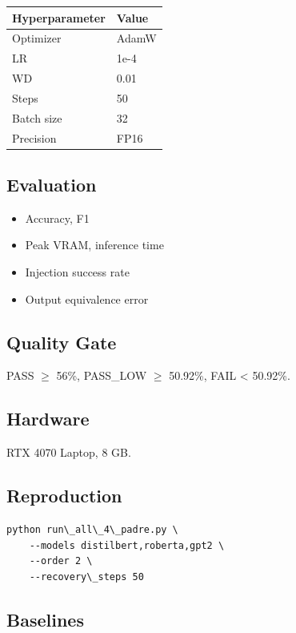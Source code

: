 \begin{table}[H]
\centering
\small
\begin{tabular}{ll}
\toprule
\textbf{Hyperparameter} & \textbf{Value} \\
\midrule
Optimizer & AdamW \\
LR & 1e-4 \\
WD & 0.01 \\
Steps & 50 \\
Batch size & 32 \\
Precision & FP16 \\
\bottomrule
\end{tabular}
\end{table}

\subsection{Evaluation}

\begin{itemize}
\item Accuracy, F1
\item Peak VRAM, inference time
\item Injection success rate
\item Output equivalence error

\end{itemize}
\subsection{Quality Gate}

PASS $\ge$ 56\%, PASS\_LOW $\ge$ 50.92\%, FAIL \textless{} 50.92\%.

\subsection{Hardware}

RTX 4070 Laptop, 8 GB.

\subsection{Reproduction}

\begin{lstlisting}
python run\_all\_4\_padre.py \
    --models distilbert,roberta,gpt2 \
    --order 2 \
    --recovery\_steps 50
\end{lstlisting}

\subsection{Baselines}

